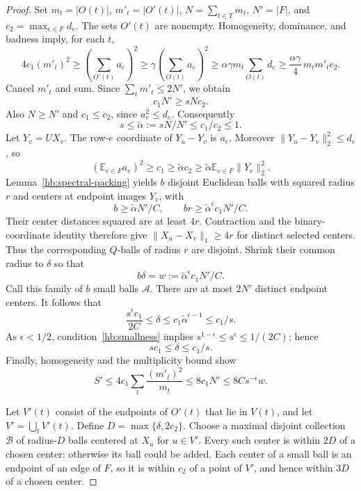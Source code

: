 \begin{proof}
Set $m_t=|O(t)|$, $m'_t=|O'(t)|$,
$N=\sum_{t\in T}m_t$, $N'=|F|$, and $c_2=\max_{e\in F}d_e$.
The sets $O'(t)$ are nonempty.  Homogeneity, dominance, and badness
imply, for each $t$,
\[
 4c_1(m'_t)^2
 \ge\left(\sum_{O'(t)}a_e\right)^2
 \ge\gamma\left(\sum_{O(t)}a_e\right)^2
 \ge\alpha\gamma m_t\sum_{O(t)}d_e
 \ge\frac{\alpha\gamma}{4}\,m_tm'_tc_2.
\]
Cancel $m'_t$ and sum.  Since
$\sum_t m'_t\le2N'$, we obtain
\begin{equation}\label{hb:density}
 c_1N'\ge sNc_2.
\end{equation}
Also $N\ge N'$ and $c_1\le c_2$, since $a_e^2\le d_e$.
Consequently
\[
 s\le\widetilde\alpha:=sN/N'\le c_1/c_2\le1.
\]
Let $Y_v=UX_v$.  The row-$e$ coordinate of $Y_u-Y_v$ is $a_e$.
Moreover $\|Y_u-Y_v\|_2^2\le d_e$, so
\[
 (\mathbb E_{e\in F}a_e)^2
 \ge c_1\ge\widetilde\alpha c_2
 \ge\widetilde\alpha\mathbb E_{e\in F}\|Y_e\|_2^2.
\]
Lemma~\ref{hb:spectral-packing} yields $b$ disjoint Euclidean balls
with squared radius $r$ and centers at endpoint images $Y_v$, with
\[
 b\ge\widetilde\alpha N'/C,
 \qquad br\ge\widetilde\alpha^\epsilon c_1N'/C.
\]
Their center distances squared are at least $4r$.  Contraction and
the binary-coordinate identity therefore give $\|X_u-X_v\|_1\ge4r$
for distinct selected centers.  Thus the corresponding $Q$-balls of
radius $r$ are disjoint.  Shrink their common radius to $\delta$ so that
\begin{equation}\label{hb:normalized-mass}
 b\delta=w:=\widetilde\alpha^\epsilon c_1N'/C.
\end{equation}
Call this family of $b$ small balls $\mathcal A$.
There are at most $2N'$ distinct endpoint centers.  It follows that
\[
 \frac{s^\epsilon c_1}{2C}\le\delta
 \le c_1\widetilde\alpha^{\epsilon-1}\le c_1/s.
\]
As $\epsilon<1/2$, condition~\eqref{hb:smallness} implies
$s^{1-\epsilon}\le s^\epsilon\le1/(2C)$; hence
\begin{equation}\label{hb:radius-range}
 sc_1\le\delta\le c_1/s.
\end{equation}
Finally, homogeneity and the multiplicity bound show
\begin{equation}\label{hb:numerator-mass}
 S'\le4c_1\sum_t\frac{(m'_t)^2}{m_t}
 \le8c_1N'\le8Cs^{-\epsilon}w.
\end{equation}

Let $V'(t)$ consist of the endpoints of $O'(t)$ that lie in $V(t)$,
and let $V'=\bigcup_tV'(t)$.  Define
$D=\max\{\delta,2c_2\}$.  Choose a maximal disjoint collection
$\mathcal B$ of radius-$D$ balls centered at $X_u$ for $u\in V'$.
Every such center is within $2D$ of a chosen center: otherwise its ball
could be added.  Each center of a small ball is an endpoint of an edge
of $F$, so it is within $c_2$ of a point of $V'$, and hence within $3D$
of a chosen center.


\end{proof}
